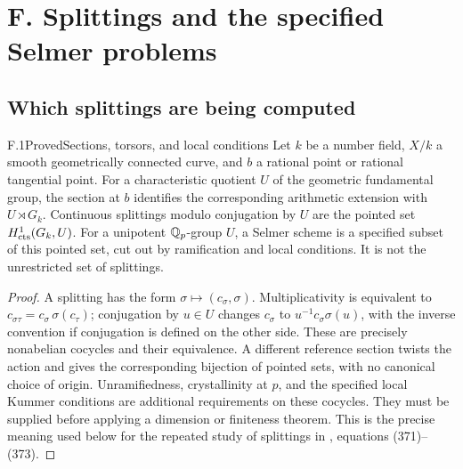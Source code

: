 \section{F. Splittings and the specified Selmer problems}

\subsection{Which splittings are being computed}

\begin{statement}{F.1}{Proved}{Sections, torsors, and local conditions}
Let $k$ be a number field, $X/k$ a smooth geometrically connected
curve, and $b$ a rational point or rational tangential point.
For a characteristic quotient $U$ of the geometric fundamental
group, the section at $b$ identifies the corresponding
arithmetic extension with $U\rtimes G_k$. Continuous splittings
modulo conjugation by $U$ are the pointed set
$H^1_{\rm cts}(G_k,U)$. For a unipotent $\mathbb Q_p$-group $U$,
a Selmer scheme is a specified subset of this pointed set,
cut out by ramification and local conditions. It is not the
unrestricted set of splittings.
\end{statement}
\begin{proof}
A splitting has the form $\sigma\mapsto(c_\sigma,\sigma)$.
Multiplicativity is equivalent to
$c_{\sigma\tau}=c_\sigma\,\sigma(c_\tau)$; conjugation by
$u\in U$ changes $c_\sigma$ to $u^{-1}c_\sigma\sigma(u)$,
with the inverse convention if conjugation is defined on
the other side. These are precisely nonabelian cocycles
and their equivalence. A different reference section twists
the action and gives the corresponding bijection of
pointed sets, with no canonical choice of origin.
Unramifiedness, crystallinity at $p$, and the specified
local Kummer conditions are additional requirements on
these cocycles. They must be supplied before applying a
dimension or finiteness theorem. This is the precise
meaning used below for the repeated study of splittings
in , equations (371)--(373).
\end{proof}

